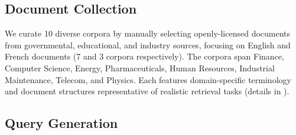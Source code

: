 

\subsection{Document Collection}

We curate 10 diverse corpora by manually selecting openly-licensed documents from governmental, educational, and industry sources, focusing on English and French documents (7 and 3 corpora respectively). The corpora span Finance, Computer Science, Energy, Pharmaceuticals, Human Resources, Industrial Maintenance, Telecom, and Physics. Each features domain-specific terminology and document structures representative of realistic retrieval tasks (details in ).


\subsection{Query Generation}


